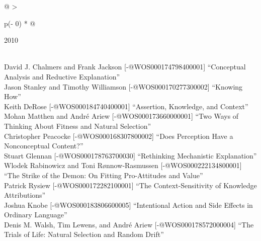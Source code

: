 \documentclass[
  10pt,
  letterpaper,
  DIV=11,
  numbers=noendperiod,
  twoside]{scrartcl}
\begin{document}
\begin{longtable}[]{@{}
  >{\raggedright\arraybackslash}p{(\columnwidth - 0\tabcolsep) * }@{}}

\caption{\label{tbl-top-ten-2001}Most cited articles published less than
ten years ago as of 2010.}

\tabularnewline

\toprule\noalign{}
\begin{minipage}[b]{\linewidth}\raggedright
2010
\end{minipage} \\
\midrule\noalign{}
\endhead
\bottomrule\noalign{}
\endlastfoot
David J. Chalmers and Frank Jackson {[}-@WOS000174798400001{]}
``Conceptual Analysis and Reductive Explanation'' \\
Jason Stanley and Timothy Williamson {[}-@WOS000170277300002{]}
``Knowing How'' \\
Keith DeRose {[}-@WOS000184740400001{]} ``Assertion, Knowledge, and
Context'' \\
Mohan Matthen and André Ariew {[}-@WOS000173660000001{]} ``Two Ways of
Thinking About Fitness and Natural Selection'' \\
Christopher Peacocke {[}-@WOS000168307800002{]} ``Does Perception Have a
Nonconceptual Content?'' \\
Stuart Glennan {[}-@WOS000178763700030{]} ``Rethinking Mechanistic
Explanation'' \\
Wlodek Rabinowicz and Toni Rønnow‐Rasmussen {[}-@WOS000222134800001{]}
``The Strike of the Demon: On Fitting Pro-Attitudes and Value'' \\
Patrick Rysiew {[}-@WOS000172282100001{]} ``The Context-Sensitivity of
Knowledge Attributions'' \\
Joshua Knobe {[}-@WOS000183806600005{]} ``Intentional Action and Side
Effects in Ordinary Language'' \\
Denis M. Walsh, Tim Lewens, and André Ariew {[}-@WOS000178572000004{]}
``The Trials of Life: Natural Selection and Random Drift'' \\

\end{longtable}
\end{document}
